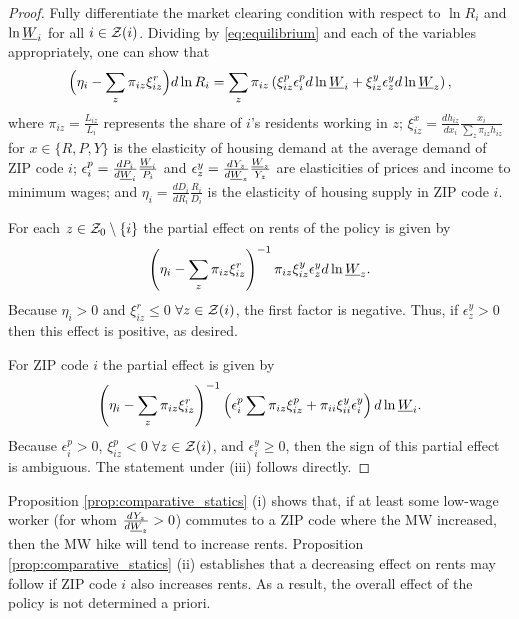 \begin{proof}
    Fully differentiate the market clearing condition with respect to $\ln R_i$ 
    and $\ln \underline{W}_i$ for all $i\in\mathcal{Z}(i)$.
    Dividing by \ref{eq:equilibrium} and each of the variables appropriately, 
    one can show that
    \begin{equation}\label{eq:diff_equilibrium}
        \Big(\eta_i - \sum_z \pi_{iz} \xi^r_{iz} \Big) d \ln R_i
        = 
        \sum_z \pi_{iz} \left(\xi^p_{iz} \epsilon_{i}^p d \ln \underline{W}_i 
                            + \xi^y_{iz} \epsilon_{z}^y d \ln \underline{W}_z \right) ,
    \end{equation}
    where
    $\pi_{iz} = \frac{L_{iz}}{L_i}$ represents the share of $i$'s residents 
    working in $z$;
    $\xi_{iz}^x = \frac{d h_{iz}}{d x_i} \frac{x_i}{\sum_z \pi_{iz} h_{iz}}$ for
    $x\in\{R,P,Y\}$ is the elasticity of housing demand at the average demand of
    ZIP code $i$;
    $\epsilon_{i}^p = \frac{d P_i}{d \underline{W}_i} \frac{\underline{W}_i}{P_i}$ and 
    $\epsilon_{z}^y = \frac{d Y_z}{d \underline{W}_z} \frac{\underline{W}_z}{Y_z}$ are
    elasticities of prices and income to minimum wages; and
    $\eta_i = \frac{d D_i}{d R_i} \frac{R_i}{D_i}$ is the elasticity 
    of housing supply in ZIP code $i$.

    For each $z\in\mathcal{Z}_0\setminus\{i\}$ the partial effect on rents of the policy
    is given by 
    $$\left(\eta_i - \sum_z \pi_{iz} \xi^r_{iz}\right)^{-1} 
      \pi_{iz}\xi^y_{iz}\epsilon_{z}^y d\ln\underline{W}_z.$$
    Because $\eta_i>0$ and $\xi^r_{iz}\leq 0$  $\forall z\in\mathcal{Z}(i)$, the first 
    factor is negative.
    Thus, if $\epsilon_{z}^y>0$ then this effect is positive, as desired.

    For ZIP code $i$ the partial effect is given by
    $$\left(\eta_i - \sum_z \pi_{iz} \xi^r_{iz}\right)^{-1} 
      \left(\epsilon_{i}^p \sum \pi_{iz}\xi^p_{iz} 
            + \pi_{ii}\xi^y_{ii}\epsilon_i^y \right)d\ln\underline{W}_i.$$
    Because $\epsilon_{i}^p>0$, $\xi^p_{iz}<0$ $\forall z\in\mathcal{Z}(i)$,
    and $\epsilon_{i}^y\geq0$, 
    then the sign of this partial effect is ambiguous.
    The statement under (iii) follows directly.
\end{proof}

Proposition \ref{prop:comparative_statics} (i) shows that, 
if at least some low-wage worker (for whom $\frac{d Y_z}{d \underline{W}_z}>0$) 
commutes to a ZIP code where the MW increased, 
then the MW hike will tend to increase rents.
Proposition \ref{prop:comparative_statics} (ii) establishes that a decreasing
effect on rents may follow if ZIP code $i$ also increases rents.
As a result, the overall effect of the policy is not determined a priori.


